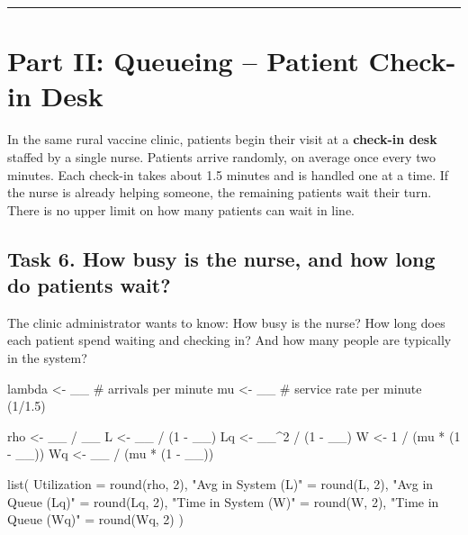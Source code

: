 \documentclass[
]{article}
\newenvironment{Shaded}{\begin{snugshade}}{\end{snugshade}}
\newcommand{\AttributeTok}[1]{\textcolor[rgb]{0.40,0.45,0.13}{#1}}
\newcommand{\CommentTok}[1]{\textcolor[rgb]{0.37,0.37,0.37}{#1}}
\newcommand{\DecValTok}[1]{\textcolor[rgb]{0.68,0.00,0.00}{#1}}
\newcommand{\FunctionTok}[1]{\textcolor[rgb]{0.28,0.35,0.67}{#1}}
\newcommand{\NormalTok}[1]{\textcolor[rgb]{0.00,0.23,0.31}{#1}}
\newcommand{\OtherTok}[1]{\textcolor[rgb]{0.00,0.23,0.31}{#1}}
\newcommand{\SpecialCharTok}[1]{\textcolor[rgb]{0.37,0.37,0.37}{#1}}
\newcommand{\StringTok}[1]{\textcolor[rgb]{0.13,0.47,0.30}{#1}}
\begin{document}
\begin{center}\rule{0.5\linewidth}{0.5pt}\end{center}

\section{Part II: Queueing -- Patient Check-in
Desk}\label{part-ii-queueing-patient-check-in-desk}

In the same rural vaccine clinic, patients begin their visit at a
\textbf{check-in desk} staffed by a single nurse. Patients arrive
randomly, on average once every two minutes. Each check-in takes about
1.5 minutes and is handled one at a time. If the nurse is already
helping someone, the remaining patients wait their turn. There is no
upper limit on how many patients can wait in line.

\subsection{Task 6. How busy is the nurse, and how long do patients
wait?}\label{task-6.-how-busy-is-the-nurse-and-how-long-do-patients-wait}

The clinic administrator wants to know: How busy is the nurse? How long
does each patient spend waiting and checking in? And how many people are
typically in the system?

\begin{Shaded}
\begin{Highlighting}[]
\NormalTok{lambda }\OtherTok{\textless{}{-}}\NormalTok{ \_\_  }\CommentTok{\# arrivals per minute}
\NormalTok{mu }\OtherTok{\textless{}{-}}\NormalTok{ \_\_      }\CommentTok{\# service rate per minute (1/1.5)}

\NormalTok{rho }\OtherTok{\textless{}{-}}\NormalTok{ \_\_ }\SpecialCharTok{/}\NormalTok{ \_\_}
\NormalTok{L }\OtherTok{\textless{}{-}}\NormalTok{ \_\_ }\SpecialCharTok{/}\NormalTok{ (}\DecValTok{1} \SpecialCharTok{{-}}\NormalTok{ \_\_)}
\NormalTok{Lq }\OtherTok{\textless{}{-}}\NormalTok{ \_\_}\SpecialCharTok{\^{}}\DecValTok{2} \SpecialCharTok{/}\NormalTok{ (}\DecValTok{1} \SpecialCharTok{{-}}\NormalTok{ \_\_)}
\NormalTok{W }\OtherTok{\textless{}{-}} \DecValTok{1} \SpecialCharTok{/}\NormalTok{ (mu }\SpecialCharTok{*}\NormalTok{ (}\DecValTok{1} \SpecialCharTok{{-}}\NormalTok{ \_\_))}
\NormalTok{Wq }\OtherTok{\textless{}{-}}\NormalTok{ \_\_ }\SpecialCharTok{/}\NormalTok{ (mu }\SpecialCharTok{*}\NormalTok{ (}\DecValTok{1} \SpecialCharTok{{-}}\NormalTok{ \_\_))}

\FunctionTok{list}\NormalTok{(}
  \AttributeTok{Utilization =} \FunctionTok{round}\NormalTok{(rho, }\DecValTok{2}\NormalTok{),}
  \StringTok{"Avg in System (L)"} \OtherTok{=} \FunctionTok{round}\NormalTok{(L, }\DecValTok{2}\NormalTok{),}
  \StringTok{"Avg in Queue (Lq)"} \OtherTok{=} \FunctionTok{round}\NormalTok{(Lq, }\DecValTok{2}\NormalTok{),}
  \StringTok{"Time in System (W)"} \OtherTok{=} \FunctionTok{round}\NormalTok{(W, }\DecValTok{2}\NormalTok{),}
  \StringTok{"Time in Queue (Wq)"} \OtherTok{=} \FunctionTok{round}\NormalTok{(Wq, }\DecValTok{2}\NormalTok{)}
\NormalTok{)}
\end{Highlighting}
\end{Shaded}
\end{document}
